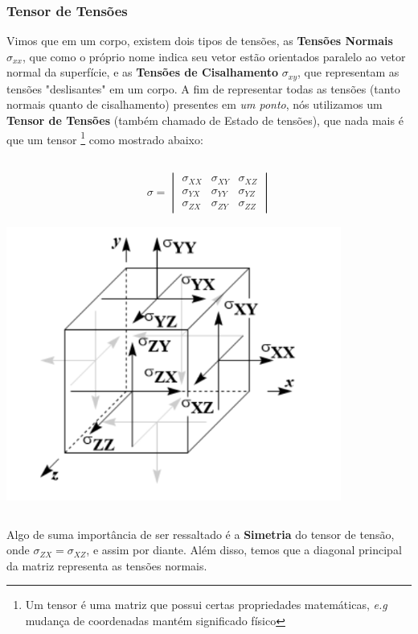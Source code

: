 \documentclass{article}
\begin{document}
\subsubsection*{Tensor de Tensões}

Vimos que em um corpo, existem dois tipos de tensões, as \textbf{Tensões Normais} $\sigma_{xx}$, que como o próprio nome indica seu vetor estão orientados paralelo ao vetor normal da superfície, e as \textbf{Tensões de Cisalhamento} $\sigma_{xy}$, que representam as tensões "deslisantes" em um corpo. A fim de representar todas as tensões (tanto normais quanto de cisalhamento) presentes em \emph{um ponto}, nós utilizamos um  \textbf{Tensor de Tensões} (também chamado de Estado de tensões), que nada mais é que um tensor \footnote{Um tensor é uma matriz que possui certas propriedades matemáticas, \emph{e.g} mudança de coordenadas mantém significado físico} como mostrado abaixo:

$$$$
\begin{minipage}{.5\textwidth}
    \begin{align*}
        \sigma = \begin{vmatrix}
                     \sigma_{XX} & \sigma_{XY} & \sigma_{XZ} \\
                     \sigma_{YX} & \sigma_{YY} & \sigma_{YZ} \\
                     \sigma_{ZX} & \sigma_{ZY} & \sigma_{ZZ}
                 \end{vmatrix}
    \end{align*}
\end{minipage}
\begin{minipage}{.5\textwidth}
    \includegraphics[width=.5\textwidth]{imgs/tensões.png.png}
\end{minipage}
$$$$

Algo de suma importância de ser ressaltado é a \textbf{Simetria} do tensor de tensão, onde $\sigma_{ZX} = \sigma_{XZ}$, e assim por diante. Além disso, temos que a diagonal principal da matriz representa as tensões normais.
\end{document}
